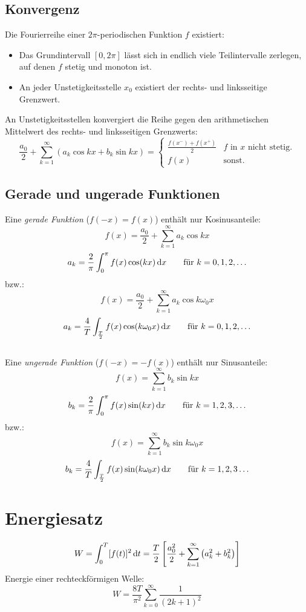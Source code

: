 \subsection{Konvergenz}
Die Fourierreihe einer $2\pi$-periodischen Funktion $f$ existiert:
\begin{itemize}
	\item Das Grundintervall $[0,2\pi]$ lässt sich in endlich viele Teilintervalle zerlegen,
	auf denen $f$ stetig und monoton ist.
	\item An jeder Unstetigkeitsstelle $x_0$ existiert der rechts- und linksseitige
	Grenzwert.
\end{itemize}
An Unstetigkeitsstellen konvergiert die Reihe gegen den arithmetischen Mittelwert des
rechts- und linksseitigen Grenzwerts:
\[ \frac{a_0}{2} + \sum_{k=1}^{\infty}\left( a_k\cos kx + b_k\sin kx \right) = \left\lbrace
	\begin{matrix} \frac{f(x^-)+f(x^+)}{2} & f\text{ in }x\text{ nicht stetig.}\\
	 f(x) & \text{sonst.}\end{matrix}\right. \]

\subsection{Gerade und ungerade Funktionen}
Eine \textit{gerade Funktion} ($f(-x)=f(x)$) enthält nur Kosinusanteile:
\[ f(x) = \frac{a_0}{2} + \sum_{k=1}^{\infty} a_k\cos kx \]
\[ a_k = \frac{2}{\pi}\int_{0}^{\pi}f(x)\cos(kx)\,\mathrm{d} x \qquad \text{für }k=0,1,2,\ldots  \]
bzw.:
\[ f(x) = \frac{a_0}{2} + \sum_{k=1}^{\infty}a_k\cos k\omega_0x \]
\[ a_k = \frac{4}{T}\int_{\frac{T}{2}}f(x)\cos(k\omega_0x)\,\mathrm{d} x \qquad \text{für }k=0,1,2,\ldots  \]
~\\
Eine \textit{ungerade Funktion} ($f(-x)=-f(x)$) enthält nur Sinusanteile:
\[ f(x) = \sum_{k=1}^{\infty} b_k\sin kx \]
\[ b_k = \frac{2}{\pi}\int_{0}^{\pi}f(x)\sin(kx)\,\mathrm{d} x \qquad \text{für }k=1,2,3,\ldots  \]
bzw.:
\[ f(x) = \sum_{k=1}^{\infty}b_k\sin k\omega_0x \]
\[ b_k = \frac{4}{T}\int_{\frac{T}{2}}f(x)\sin(k\omega_0x)\,\mathrm{d} x \qquad \text{für }k=1,2,3\ldots  \]

\section{Energiesatz}
\[ W=\int_{0}^{T}[f(t)]^2\,\mathrm{d} t = \frac{T}{2}\left[ \frac{a_0^2}{2} + \sum_{k=1}^{\infty}
	\left(a_k^2+b_k^2\right) \right] \]
Energie einer rechteckförmigen Welle:
\[ W=\frac{8T}{\pi^2}\sum_{k=0}^{\infty}\frac{1}{(2k+1)^2} \]

